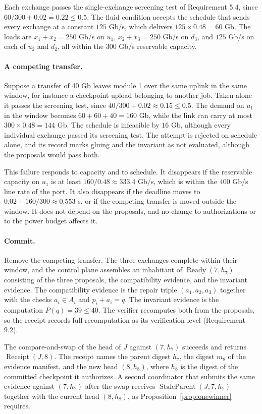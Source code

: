 \documentclass[11pt,openany]{book}
\theoremstyle{remark}
\begin{document}
Each exchange passes the single-exchange screening test of Requirement 5.4, since $60/300+0.02=0.22\le0.5$. The fluid condition accepts the schedule that sends every exchange at a constant $125$ Gb/s, which delivers $125\times0.48=60$ Gb. The loads are $x_1+x_2=250$ Gb/s on $u_1$, $x_2+x_3=250$ Gb/s on $d_3$, and $125$ Gb/s on each of $u_2$ and $d_2$, all within the $300$ Gb/s reservable capacity.

\paragraph{A competing transfer.} Suppose a transfer of $40$ Gb leaves module 1 over the same uplink in the same window, for instance a checkpoint upload belonging to another job. Taken alone it passes the screening test, since $40/300+0.02\approx0.15\le0.5$. The demand on $u_1$ in the window becomes $60+60+40=160$ Gb, while the link can carry at most $300\times0.48=144$ Gb. The schedule is infeasible by $16$ Gb, although every individual exchange passed its screening test. The attempt is rejected on schedule alone, and its record marks gluing and the invariant as not evaluated, although the proposals would pass both.

This failure responds to capacity and to schedule. It disappears if the reservable capacity on $u_1$ is at least $160/0.48\approx333.4$ Gb/s, which is within the $400$ Gb/s line rate of the port. It also disappears if the deadline moves to $0.02+160/300\approx0.553$ s, or if the competing transfer is moved outside the window. It does not depend on the proposals, and no change to authorizations or to the power budget affects it.

\paragraph{Commit.} Remove the competing transfer. The three exchanges complete within their window, and the control plane assembles an inhabitant of $\operatorname{Ready}(7,h_7)$ consisting of the three proposals, the compatibility evidence, and the invariant evidence. The compatibility evidence is the repair triple $(a_1,a_2,a_3)$ together with the checks $a_i\in A_i$ and $p_i+a_i=q$. The invariant evidence is the computation $P(q)=39\le40$. The verifier recomputes both from the proposals, so the receipt records full recomputation as its verification level (Requirement 9.2).

The compare-and-swap of the head of $J$ against $(7,h_7)$ succeeds and returns $\operatorname{Receipt}(J,8)$. The receipt names the parent digest $h_7$, the digest $m_8$ of the evidence manifest, and the new head $(8,h_8)$, where $h_8$ is the digest of the committed checkpoint it authorizes. A second coordinator that submits the same evidence against $(7,h_7)$ after the swap receives $\operatorname{StaleParent}(J,7,h_7)$ together with the current head $(8,h_8)$, as Proposition~\ref{prop:onewinner} requires.
\end{document}
